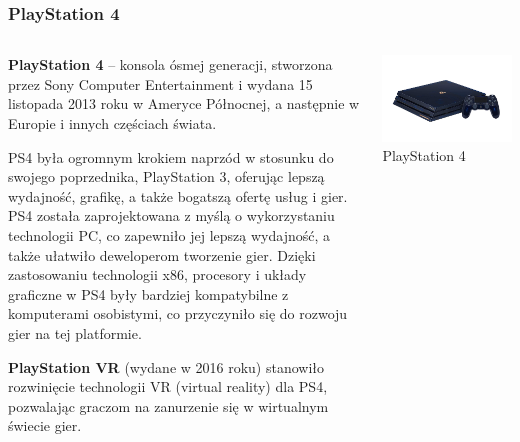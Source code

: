 \documentclass[8pt]{beamer}
\begin{document}
\begin{frame}
\frametitle{PlayStation 4}
\begin{columns}

\begin{column}{0.6\textwidth}
\textbf {PlayStation 4} – konsola ósmej generacji, stworzona przez Sony Computer Entertainment i wydana 15 listopada 2013 roku w Ameryce Północnej, a następnie w Europie i innych częściach świata.

\vspace{0.5em} 
PS4 była ogromnym krokiem naprzód w stosunku do swojego poprzednika, PlayStation 3, oferując lepszą wydajność, grafikę, a także bogatszą ofertę usług i gier. PS4 została zaprojektowana z myślą o wykorzystaniu technologii PC, co zapewniło jej lepszą wydajność, a także ułatwiło deweloperom tworzenie gier. Dzięki zastosowaniu technologii x86, procesory i układy graficzne w PS4 były bardziej kompatybilne z komputerami osobistymi, co przyczyniło się do rozwoju gier na tej platformie.

\vspace{0.5em}
\textbf {PlayStation VR} (wydane w 2016 roku) stanowiło rozwinięcie technologii VR (virtual reality) dla PS4, pozwalając graczom na zanurzenie się w wirtualnym świecie gier.

\end{column}

\begin{column}{0.35\textwidth}
        \centering
        \includegraphics[width=\textwidth]{ps4.jpg} 
        {\small PlayStation 4} 
    \end{column}
\end{columns}

\end{frame}
\end{document}
